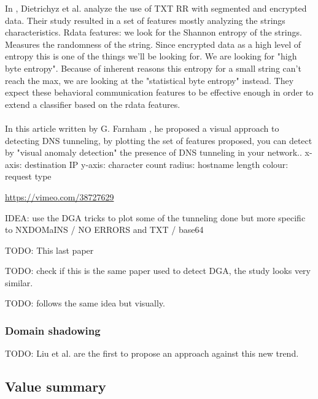 In \cite{tunn1}, Dietrichyz et al. analyze the use of TXT RR with segmented and encrypted data. Their study resulted in a set of features mostly analyzing the strings characteristics. Rdata features: we look for the Shannon entropy of the strings. Measures the randomness of the string. Since encrypted data as a high level of entropy this is one of the things we'll be looking for. We are looking for "high byte entropy". Because of inherent reasons this entropy for a small string can't reach the max, we are looking at the "statistical byte entropy" instead. They expect these behavioral communication features to be effective enough in order to extend a classifier based on the rdata features.\\
\\
In this article written by G. Farnham \cite{tunn}, he proposed a visual approach to detecting DNS tunneling, by plotting the set of features proposed, you can detect by "visual anomaly detection" the presence of DNS tunneling in your network.. 
x-axis: destination IP
y-axis: character count
radius: hostname length
colour: request type

\url{https://vimeo.com/38727629}

IDEA: use the DGA tricks to plot some of the tunneling done
but more specific to NXDOMaINS / NO ERRORS and TXT / base64

TODO: This last paper \cite{dns-tun}

\cite{tunn2}

TODO: check if this is the same paper used to detect DGA, the study looks very similar. %

\cite{tunn3} 

\cite{tunn4}

TODO: follows the same idea but visually.

\subsubsection{Domain shadowing}
TODO: Liu et al. \cite{shadowing} are the first to propose an approach against this new trend. 


\subsection{Value summary}


